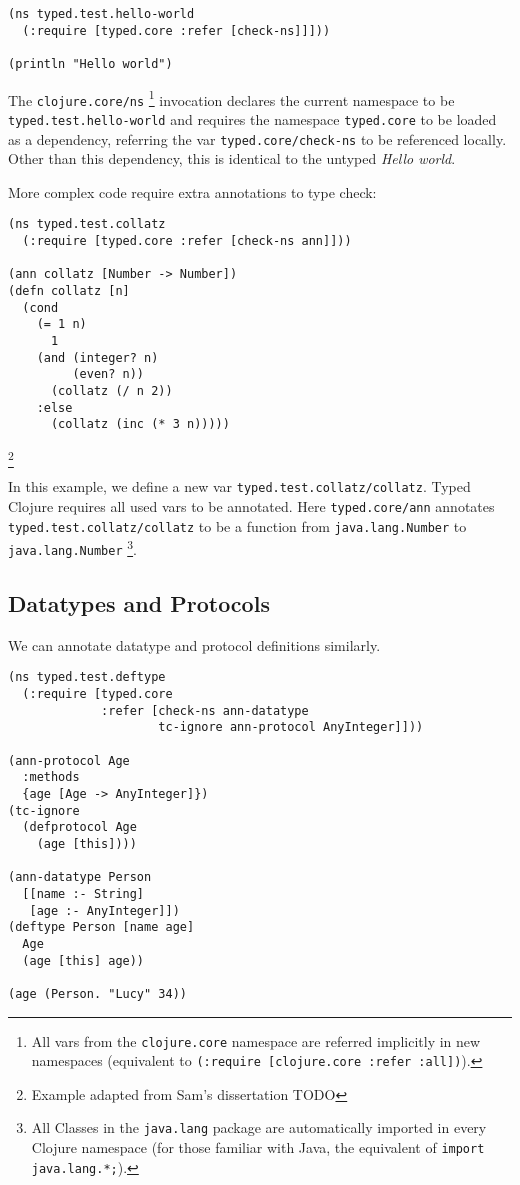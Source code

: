 \begin{lstlisting}[caption=Hello world]
(ns typed.test.hello-world
  (:require [typed.core :refer [check-ns]]]))

(println "Hello world")
\end{lstlisting}

The \lstinline|clojure.core/ns|
\footnote{All vars from the \lstinline|clojure.core| namespace are referred implicitly in new namespaces (equivalent to \lstinline|(:require [clojure.core :refer :all])|).}
invocation declares the current namespace to be \lstinline|typed.test.hello-world|
and requires the namespace \lstinline|typed.core| to be loaded as a dependency, referring the var
\lstinline|typed.core/check-ns| to be referenced locally. Other than this
dependency, this is identical to the untyped \emph{Hello world}.

More complex code require extra annotations to type check:

\begin{lstlisting}
(ns typed.test.collatz
  (:require [typed.core :refer [check-ns ann]]))

(ann collatz [Number -> Number])
(defn collatz [n]
  (cond
    (= 1 n) 
      1
    (and (integer? n) 
         (even? n)) 
      (collatz (/ n 2))
    :else 
      (collatz (inc (* 3 n)))))
\end{lstlisting}
\footnote{Example adapted from Sam's dissertation TODO}

In this example, we define a new var \lstinline|typed.test.collatz/collatz|. Typed Clojure requires all 
used vars to be annotated. Here \lstinline|typed.core/ann| annotates \lstinline|typed.test.collatz/collatz|
to be a function from \lstinline{java.lang.Number} to 
\lstinline{java.lang.Number}
\footnote{All Classes in the \lstinline|java.lang| package
are automatically imported in every Clojure namespace (for those familiar with Java, the equivalent of \lstinline|import java.lang.*;|).}.

\subsection{Datatypes and Protocols}

We can annotate datatype and protocol definitions similarly.

\begin{lstlisting}
(ns typed.test.deftype
  (:require [typed.core 
             :refer [check-ns ann-datatype
                     tc-ignore ann-protocol AnyInteger]]))

(ann-protocol Age 
  :methods
  {age [Age -> AnyInteger]})
(tc-ignore
  (defprotocol Age
    (age [this])))

(ann-datatype Person 
  [[name :- String]
   [age :- AnyInteger]])
(deftype Person [name age]
  Age
  (age [this] age))

(age (Person. "Lucy" 34))
\end{lstlisting}

